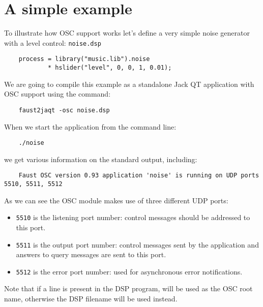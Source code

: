 \section{A simple example}

To illustrate how OSC support works let's define a very simple noise generator with a level control: \lstinline'noise.dsp'
\begin{lstlisting}
	process = library("music.lib").noise 
	        * hslider("level", 0, 0, 1, 0.01);
\end{lstlisting}
	
We are going to compile this example as a standalone Jack QT application with OSC support using the command:
\begin{lstlisting}
	faust2jaqt -osc noise.dsp
\end{lstlisting}

When we start the application from the command line:
\begin{lstlisting}
	./noise 
\end{lstlisting}
we get various information on the standard output, including:
\begin{lstlisting}
	Faust OSC version 0.93 application 'noise' is running on UDP ports 5510, 5511, 5512
\end{lstlisting}
As we can see the OSC module makes use of three different UDP ports:
\begin{itemize}
\item \lstinline'5510' is the listening port number: control messages should be addressed to this port.
\item \lstinline'5511' is the output port number: control messages sent by the application and answers to query messages are sent to this port.
\item \lstinline'5512' is the error port number: used for asynchronous error notifications.
\end{itemize}

Note that if a  line is present in the DSP program,  will be used as the OSC root name, otherwise the DSP filename will be used instead.

